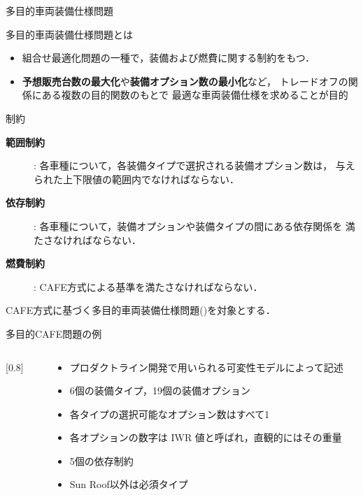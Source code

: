 \documentclass[dvipdfmx, 11pt]{beamer}
\begin{document}
\begin{frame}{多目的車両装備仕様問題}
 \begin{alertblock}{多目的車両装備仕様問題とは}
  \begin{itemize}
   \item 組合せ最適化問題の一種で，装備および燃費に関する制約をもつ．
   \item {\bf 予想販売台数の最大化}や{\bf 装備オプション数の最小化}など，
	 トレードオフの関係にある複数の目的関数のもとで
	 最適な車両装備仕様を求めることが目的
  \end{itemize}
 \end{alertblock}
 \begin{block}{制約}
  \begin{description}
   \item[{\bf 範囲制約}]: 各車種について，各装備タイプで選択される装備オプション数は，
	      与えられた上下限値の範囲内でなければならない．
   \item[{\bf 依存制約}]: 各車種について，装備オプションや装備タイプの間にある依存関係を
	      満たさなければならない．
   \item[{\bf 燃費制約}]: CAFE方式による基準を満たさなければならない．
  \end{description}
 \end{block}
 CAFE方式に基づく多目的車両装備仕様問題()を対象とする．
\end{frame}
\begin{frame}{多目的CAFE問題の例}

  \begin{columns}
    \begin{column}{0.75\linewidth}
      \scalebox{0.8}[0.8]{}
    \end{column}
    \begin{column}{0.25\linewidth}
      \begin{footnotesize}
        \begin{itemize}
        \item プロダクトライン開発で用いられる可変性モデルによって記述
        \item 6個の装備タイプ，19個の装備オプション
        \item 各タイプの選択可能なオプション数はすべて1
        \item 各オプションの数字は IWR 値と呼ばれ，直観的にはその重量
        \item 5個の依存制約
        \item \textsf{Sun Roof}以外は必須タイプ
        \end{itemize}
      \end{footnotesize}
    \end{column}
  \end{columns}
\end{frame}
\end{document}
